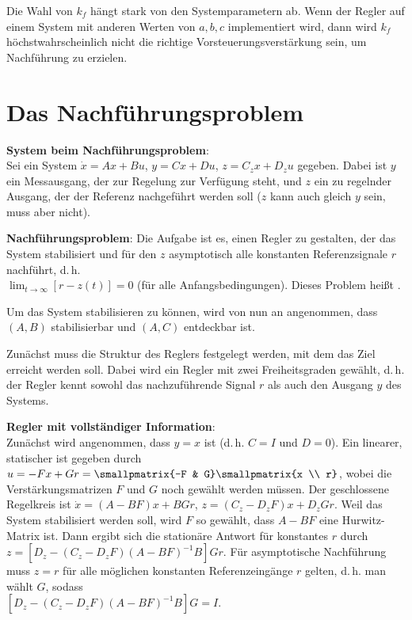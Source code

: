 Die Wahl von $k_f$ hängt stark von den Systemparametern ab.
Wenn der Regler auf einem System mit anderen Werten von $a, b, c$ implementiert wird, dann wird
$k_f$ höchstwahrscheinlich nicht die richtige Vorsteuerungsverstärkung sein, um Nachführung zu
erzielen.

\pagebreak

\section{%
    Das Nachführungsproblem%
}

\textbf{System beim Nachführungsproblem}:\\
Sei ein System $\dot{x} = Ax + Bu$, $y = Cx + Du$, $z = C_z x + D_z u$ gegeben.
Dabei ist $y$ ein Messausgang, der zur Regelung zur Verfügung steht, und $z$ ein zu regelnder
Ausgang, der der Referenz nachgeführt werden soll
($z$ kann auch gleich $y$ sein, muss aber nicht).

\textbf{Nachführungsproblem}:
Die Aufgabe ist es, einen Regler zu gestalten, der das System stabilisiert und für den
$z$ asymptotisch alle konstanten Referenzsignale $r$ nachführt, d.\,h.\\
$\lim_{t \to \infty} [r - z(t)] = 0$
(für alle Anfangsbedingungen).
Dieses Problem heißt .

Um das System stabilisieren zu können, wird von nun an angenommen, dass $(A, B)$ stabilisierbar
und $(A, C)$ entdeckbar ist.

Zunächst muss die Struktur des Reglers festgelegt werden, mit dem das Ziel erreicht werden soll.
Dabei wird ein Regler mit zwei Freiheitsgraden gewählt, d.\,h.
der Regler kennt sowohl das nachzuführende Signal $r$ als auch den Ausgang $y$ des Systems.

\linie

\textbf{Regler mit vollständiger Information}:\\
Zunächst wird angenommen, dass $y = x$ ist (d.\,h. $C = I$ und $D = 0$).
Ein linearer, statischer  ist gegeben durch\\
$u = -Fx + Gr = \smallpmatrix{-F & G} \smallpmatrix{x \\ r}$,
wobei die Verstärkungsmatrizen $F$ und $G$ noch gewählt werden müssen.
Der geschlossene Regelkreis ist
$\dot{x} = (A - BF)x + BGr$, $z = (C_z - D_z F)x + D_z Gr$.
Weil das System stabilisiert werden soll, wird $F$ so gewählt, dass $A - BF$ eine Hurwitz-Matrix
ist.
Dann ergibt sich die stationäre Antwort für konstantes $r$ durch\\
$z = [D_z - (C_z - D_z F)(A - BF)^{-1} B] Gr$.
Für asymptotische Nachführung muss $z = r$ für alle möglichen konstanten Referenzeingänge $r$
gelten, d.\,h. man wählt $G$, sodass\\
$[D_z - (C_z - D_z F)(A - BF)^{-1} B] G = I$.

